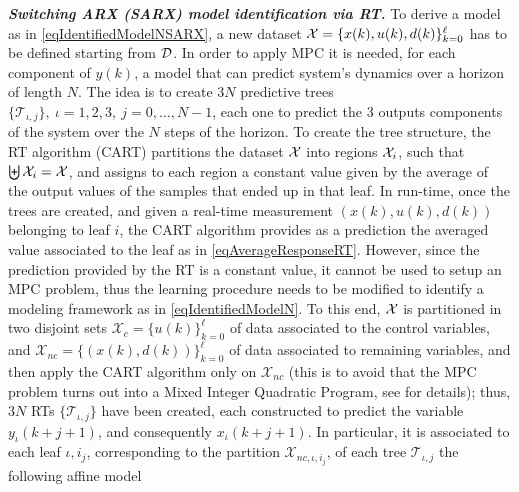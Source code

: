 
\textbf{\emph{Switching ARX (SARX) model identification via RT.}} To derive a model as in \eqref{eqIdentifiedModelNSARX}, a new dataset $\mathcal{X}= \{x(k),u(k),d(k)\}_{k = 0}^{\ell}$ has to be defined starting from $\mathcal{D}$. In order to apply MPC it is needed, for each component of $y(k)$, a model that can predict system's dynamics over a horizon of length $N$. The idea is to create $3 N$ predictive trees $\{\mathcal{T}_{\iota,j}\},\ \iota=1,2,3,\ j=0,\ldots,N-1$, each one to predict the 3 outputs components of the system over the $N$ steps of the horizon. To create the tree structure, the RT algorithm (CART) partitions the dataset $\mathcal{X}$ into regions $\mathcal{X}_i$, such that $\biguplus \mathcal{X}_i = \mathcal{X}$, and assigns to each region a constant value given by the average of the output values of the samples that ended up in that leaf. In run-time, once the trees are created, and given a real-time measurement $(x(k), u(k), d(k))$ belonging to leaf $i$, the CART algorithm provides as a prediction the averaged value associated to the leaf as in \eqref{eqAverageResponseRT}. However, since the prediction provided by the RT is a constant value, it cannot be used to setup an MPC problem, thus the learning procedure needs to be modified to identify a modeling framework as in \eqref{eqIdentifiedModelN}. To this end, $\mathcal{X}$ is partitioned in two disjoint sets $\mathcal{X}_c = \{u(k)\}_{k=0}^{\ell}$ of data associated to the control variables, and $\mathcal{X}_{nc} = \{(x(k), d(k))\}_{k=0}^{\ell}$ of data associated to remaining variables, and then apply the CART algorithm only on $\mathcal{X}_{nc}$ (this is to avoid that the MPC problem turns out into a Mixed Integer Quadratic Program, see \cite{SmarraADHS2018,smarraNAHS2020} for details); thus, $3 N$ RTs $\{\mathcal{T}_{\iota,j}\}$ have been created, each constructed to predict the variable $y_\iota(k+j+1)$, and consequently $x_\iota(k+j+1)$. In particular, it is associated to each leaf $\iota,i_j$, corresponding to the partition  $\mathcal{X}_{nc,\iota,i_j}$, of each tree $\mathcal{T}_{\iota,j}$ the following affine model

\small

